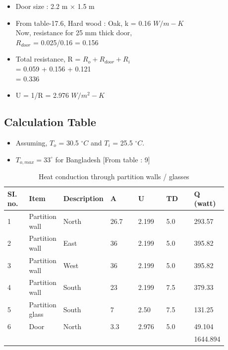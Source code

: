 \documentclass{article}
\begin{document}
  \begin{itemize}
    \item Door size : 2.2 m $\times$ 1.5 m 
    \item From table-17.6, Hard wood : Oak, k = 0.16 $W/m-K$\\
    Now, resistance for 25 mm thick door,\\ $R_{door}$ = 0.025/0.16 = 0.156 
    \item Total resistance, R = $R_o + R_{door} + R_i$ \\= 0.059 + 0.156 + 0.121 \\= 0.336 
    \item U = 1/R = 2.976 $W/m^2-K$ 
  \end{itemize}

  \vspace{0.5cm}
  \subsection{Calculation Table}

  \begin{itemize}
    \item Assuming, $T_o$ = 30.5 $^{\circ}C$ and $T_i$ = 25.5 $^{\circ}C$. 
    \item $T_{o,max} = 33^{\circ}$ for Bangladesh [From table : 9]
  \end{itemize}
  \begin{table}[ht]
    \centering
    \begin{adjustbox}{width=\textwidth}
    \begin{tabularx}{\linewidth}{p{0.10\linewidth} p{0.13\linewidth} p{0.13\linewidth} p{0.13\linewidth} p{0.13\linewidth} p{0.13\linewidth} p{0.13\linewidth}}
        \hline
        SI. no. & Item & Description & A & U & TD & Q (watt) \\
        \hline
        1 & Partition wall & North & 26.7 & 2.199 & 5.0 & 293.57 \\
        2 & Partition wall & East & 36 & 2.199 & 5.0 & 395.82 \\
        3 & Partition wall & West & 36 & 2.199 & 5.0 & 395.82 \\
        4 & Partition wall & South & 23 & 2.199 & 7.5 & 379.33 \\
        5 & Partition glass & South & 7 & 2.50 & 7.5 & 131.25 \\
        6 & Door & North & 3.3 & 2.976 & 5.0 & 49.104 \\
        \hline
        &&&&&& 1644.894 \\
        \hline
    \end{tabularx}
    \end{adjustbox}
    \caption{Heat conduction through partition walls / glasses}
    \label{tab:heat conduction through partition walls / glasses}
    \end{table}
    \vspace*{1cm}
\end{document}
